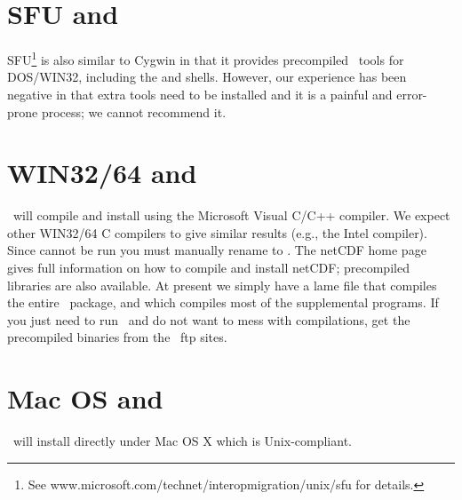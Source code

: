 
\section{SFU and \gmt}

SFU\footnote{See www.microsoft.com/technet/interopmigration/unix/sfu for details.} is also similar to Cygwin
in that it provides precompiled \UNIX\ tools for DOS/WIN32,
including the  and  shells.  However, our experience has been negative in that
extra tools need to be installed and it is a painful and error-prone process; we cannot recommend it.

\section{WIN32/64 and \gmt}

\GMT\ will compile and install using the Microsoft Visual C/C++
compiler.  We expect other WIN32/64 C compilers to give similar
results (e.g., the Intel compiler).  Since  cannot be run you
must manually rename  to
.  The netCDF home page gives full
information on how to compile and install netCDF; precompiled
libraries are also available.  At present we simply have a lame 
file that compiles the entire \GMT\
package, and  which compiles most of the
supplemental programs.  If you just need to run \GMT\ and do not want to mess with compilations,
get the precompiled binaries from the \GMT\ ftp sites.


\section{Mac OS and \gmt}

\GMT\ will install directly under Mac OS X which is Unix-compliant.
